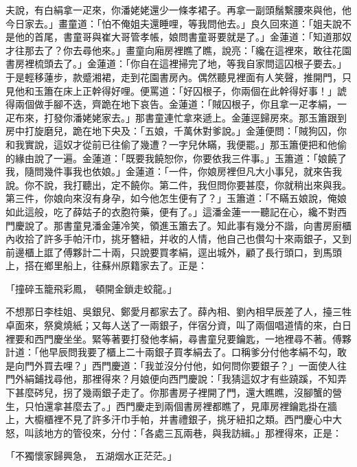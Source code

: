 夫說，有白絹拿一疋來，你潘姥姥還少一條孝裙子。再拿一副頭鬚繫腰來與他，他今日家去。」畫童道：「怕不俺姐夫還睡哩，等我問他去。」良久回來道：「姐夫說不是他的首尾，書童哥與崔大哥管孝帳，娘問書童哥要就是了。」金蓮道：「知道那奴才往那去了？你去尋他來。」畫童向廂房裡瞧了瞧，說亮：「纔在這裡來，敢往花園書房裡梳頭去了。」金蓮道：「你自在這裡掃完了地，等我自家問這囚根子要去。」于是輕移蓮步，款蹙湘裙，走到花園書房內。偶然聽見裡面有人笑聲，推開門，只見他和玉簫在床上正幹得好哩。便罵道：「好囚根子，你兩個在此幹得好事！」諕得兩個做手腳不迭，齊跪在地下哀告。金蓮道：「賊囚根子，你且拿一疋孝絹，一疋布來，打發你潘姥姥家去。」那書童連忙拿來遞上。金蓮逕歸房來。那玉簫跟到房中打旋磨兒，跪在地下央及：「五娘，千萬休對爹說。」金蓮便問：「賊狗囚，你和我實說，這奴才從前已往偷了幾遭？一字兒休瞞，我便罷。」那玉簫便把和他偷的緣由說了一遍。金蓮道：「既要我饒恕你，你要依我三件事。」玉簫道：「娘饒了我，隨問幾件事我也依娘。」金蓮道：「一件，你娘房裡但凡大小事兒，就來告我說。你不說，我打聽出，定不饒你。第二件，我但問你要甚麼，你就稍出來與我。第三件，你娘向來沒有身孕，如今他怎生便有了？」玉簫道：「不瞞五娘說，俺娘如此這般，吃了薛姑子的衣胞符藥，便有了。」這潘金蓮一一聽記在心，纔不對西門慶說了。那書童見潘金蓮冷笑，領進玉簫去了。知此事有幾分不諧，向書房廚櫃內收拾了許多手帕汗巾，挑牙簪紐，并收的人情，他自己也儹勾十來兩銀子，又到前邊櫃上誆了傅夥計二十兩，只說要買孝絹，逕出城外，顧了長行頭口，到馬頭上，搭在鄉里船上，往蘇州原籍家去了。正是：

「撞碎玉籠飛彩鳳，  頓開金鎖走蛟龍。」

不想那日李桂姐、吳銀兒、鄭愛月都家去了。薛內相、劉內相早辰差了人，擡三牲卓面來，祭奠燒紙；又每人送了一兩銀子，伴宿分資，叫了兩個唱道情的來，白日裡要和西門慶坐坐。緊等著要打發他孝絹，尋書童兒要鑰匙，一地裡尋不著。傅夥計道：「他早辰問我要了櫃上二十兩銀子買孝絹去了。口稱爹分付他孝絹不勾，敢是向門外買去哩？」西門慶道：「我並沒分付他，如何問你要銀子？」一面使人往門外絹鋪找尋他，那裡得來？月娘便向西門慶說：「我猜這奴才有些蹺蹊，不知弄下甚麼硶兒，拐了幾兩銀子走了。你那書房子裡開了門，還大瞧瞧，沒腳蟹的營生，只怕還拿甚麼去了。」西門慶走到兩個書房裡都瞧了，見庫房裡鑰匙掛在牆上，大櫥櫃裡不見了許多汗巾手帕，并書禮銀子，挑牙紐扣之類。西門慶心中大怒，叫該地方的管役來，分付：「各處三瓦兩巷，與我訪緝。」那裡得來，正是：

「不獨懷家歸興急，  五湖烟水正茫茫。」

